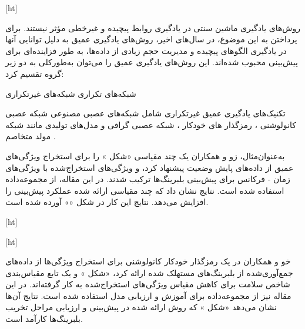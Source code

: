 [ht]



روش‌های یادگیری ماشین سنتی در یادگیری روابط پیچیده و غیرخطی مؤثر نیستند. برای پرداختن به این موضوع، در سال‌های اخیر، روش‌های یادگیری عمیق به دلیل توانایی آنها در یادگیری الگوهای پیچیده و مدیریت حجم زیادی از داده‌ها، به طور فزاینده‌ای برای پیش‌بینی  محبوب شده‌اند. این روش‌های یادگیری عمیق را می‌توان به‌طورکلی به دو زیر گروه تقسیم کرد:


 شبکه‌های تکراری
 شبکه‌های غیرتکراری


تکنیک‌های یادگیری عمیق غیرتکراری شامل شبکه‌های عصبی مصنوعی 
شبکه عصبی کانولوشنی ، رمزگذار های خودکار ، شبکه عصبی گرافی  و مدل‌های تولیدی مانند شبکه مولد متخاصم .


به‌عنوان‌مثال، زو و همکاران  یک  چند مقیاسی «شکل » را برای استخراج ویژگی‌های عمیق از داده‌های پایش وضعیت پیشنهاد کرد، و ویژگی‌های استخراج‌شده با ویژگی‌های زمان - فرکانس برای پیش‌بینی  بلبرینگ‌ها ترکیب شدند. در این مقاله، از مجموعه‌داده  استفاده شده است. نتایج نشان داد که  چند مقیاسی ارائه شده عملکرد پیش‌بینی را افزایش می‌دهد. نتایج این کار در شکل «» آورده شده است.


[ht]




[ht]


خو و همکاران در  یک رمزگذار خودکار کانولوشنی برای استخراج ویژگی‌ها از داده‌های جمع‌آوری‌شده از بلبرینگ‌های مستهلک شده ارائه کرد، «شکل » و یک تابع مقیاس‌بندی شاخص سلامت برای کاهش مقیاس ویژگی‌های استخراج‌شده به کار گرفته‌اند. در این مقاله نیز از مجموعه‌داده  برای آموزش و ارزیابی مدل استفاده شده است. نتایج آن‌ها نشان می‌دهد «شکل » که روش ارائه شده در پیش‌بینی  و ارزیابی مراحل تخریب بلبرینگ‌ها کارآمد است. 


